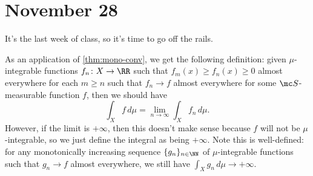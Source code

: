 \documentclass[../notes.tex]{subfiles}
\begin{document}
\section{November 28}

It's the last week of class, so it's time to go off the rails.
\begin{remark}
	As an application of \autoref{thm:mono-conv}, we get the following definition: given $\mu$-integrable functions $f_n\colon X\to\RR$ such that $f_m(x)\ge f_n(x)\ge0$ almost everywhere for each $m\ge n$ such that $f_n\to f$ almost everywhere for some $\mc S$-measurable function $f$, then we should have
	\[\int_Xf\,d\mu=\lim_{n\to\infty}\int_Xf_n\,d\mu.\]
	However, if the limit is $+\infty$, then this doesn't make sense because $f$ will not be $\mu$-integrable, so we just define the integral as being $+\infty$. Note this is well-defined: for any monotonically increasing sequence $\{g_n\}_{n\in\NN}$ of $\mu$-integrable functions such that $g_n\to f$ almost everywhere, we still have $\int_Xg_n\,d\mu\to+\infty$.
\end{remark}
\end{document}
